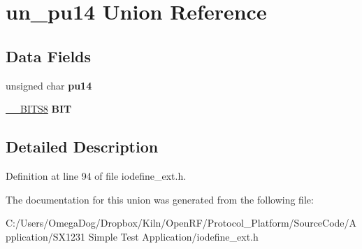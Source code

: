 \hypertarget{unionun__pu14}{\section{un\-\_\-pu14 Union Reference}
\label{unionun__pu14}
}
\subsection*{Data Fields}
\begin{DoxyCompactItemize}
\item 
\hypertarget{unionun__pu14_a0993cc537b85cd49440726267b1cb012}{unsigned char {\bfseries pu14}}\label{unionun__pu14_a0993cc537b85cd49440726267b1cb012}

\item 
\hypertarget{unionun__pu14_a2f5de4bc8285be1dd98a197264d58a16}{\hyperlink{struct_____b_i_t_s8}{\-\_\-\-\_\-\-B\-I\-T\-S8} {\bfseries B\-I\-T}}\label{unionun__pu14_a2f5de4bc8285be1dd98a197264d58a16}

\end{DoxyCompactItemize}


\subsection{Detailed Description}


Definition at line 94 of file iodefine\-\_\-ext.\-h.



The documentation for this union was generated from the following file\-:\begin{DoxyCompactItemize}
\item 
C\-:/\-Users/\-Omega\-Dog/\-Dropbox/\-Kiln/\-Open\-R\-F/\-Protocol\-\_\-\-Platform/\-Source\-Code/\-Application/\-S\-X1231 Simple Test Application/iodefine\-\_\-ext.\-h\end{DoxyCompactItemize}
